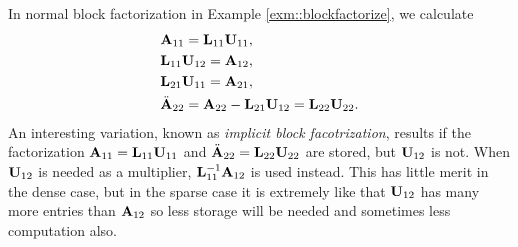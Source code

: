 \begin{exm}
    In normal block factorization in Example 
    \ref{exm::blockfactorize}, we calculate 
    \begin{align*}
        &{\mathbf{A}}_{11}={\mathbf{L}}_{11}{\mathbf{U}}_{11},\\
        &{\mathbf{L}}_{11}{\mathbf{U}}_{12}={\mathbf{A}}_{12},\\
        &{\mathbf{L}}_{21}{\mathbf{U}}_{11}={\mathbf{A}}_{21},\\
        &\ddot{{\mathbf{A}}}_{22}={\mathbf{A}}_{22}-{\mathbf{L}}_{21}{\mathbf{U}}_{12}={\mathbf{L}}_{22}
        {\mathbf{U}}_{22}.
    \end{align*}
    An interesting variation, known as \textit{implicit block 
    facotrization}, results if the factorization ${\mathbf{A}}_{11}=
    {\mathbf{L}}_{11}{\mathbf{U}}_{11}$ and $\ddot{{\mathbf{A}}}_{22}={\mathbf{L}}_{22}{\mathbf{U}}_{22}$ 
    are stored, but ${\mathbf{U}}_{12}$ is not. When ${\mathbf{U}}_{12}$ is 
    needed as a multiplier, ${\mathbf{L}}_{11}^{-1}{\mathbf{A}}_{12}$ is used 
    instead. This has little merit in the dense case, but in 
    the sparse case it is extremely like that ${\mathbf{U}}_{12}$ has 
    many more entries than ${\mathbf{A}}_{12}$ so less storage will be 
    needed and sometimes less computation also.
\end{exm}

